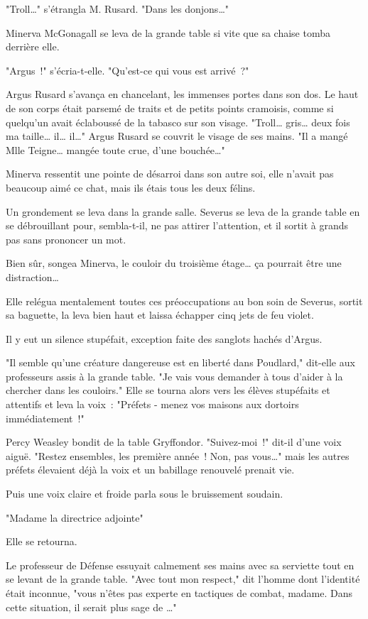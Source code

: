 "Troll…" s'étrangla M. Rusard. "Dans les donjons…"

Minerva McGonagall se leva de la grande table si vite que sa chaise tomba derrière elle.

"Argus~!" s'écria-t-elle. "Qu'est-ce qui vous est arrivé~?"

Argus Rusard s'avança en chancelant, les immenses portes dans son dos. Le haut de son corps était parsemé de traits et de petits points cramoisis, comme si quelqu'un avait éclaboussé de la tabasco sur son visage. "Troll… gris… deux fois ma taille… il… il…" Argus Rusard se couvrit le visage de ses mains. "Il a mangé Mlle Teigne… mangée toute crue, d'une bouchée…"

Minerva ressentit une pointe de désarroi dans son autre soi, elle n'avait pas beaucoup aimé ce chat, mais ils étais tous les deux félins.

Un grondement se leva dans la grande salle. Severus se leva de la grande table en se débrouillant pour, sembla-t-il, ne pas attirer l'attention, et il sortit à grands pas sans prononcer un mot.

Bien sûr, songea Minerva, le couloir du troisième étage… ça pourrait être une distraction…

Elle relégua mentalement toutes ces préoccupations au bon soin de Severus, sortit sa baguette, la leva bien haut et laissa échapper cinq jets de feu violet.

Il y eut un silence stupéfait, exception faite des sanglots hachés d'Argus.

"Il semble qu'une créature dangereuse est en liberté dans Poudlard," dit-elle aux professeurs assis à la grande table. "Je vais vous demander à tous d'aider à la chercher dans les couloirs." Elle se tourna alors vers les élèves stupéfaits et attentifs et leva la voix~: "Préfets - menez vos maisons aux dortoirs immédiatement~!"

Percy Weasley bondit de la table Gryffondor. "Suivez-moi~!" dit-il d'une voix aiguë. "Restez ensembles, les première année~! Non, pas vous…" mais les autres préfets élevaient déjà la voix et un babillage renouvelé prenait vie.

Puis une voix claire et froide parla sous le bruissement soudain.

"Madame la directrice adjointe"

Elle se retourna.

Le professeur de Défense essuyait calmement ses mains avec sa serviette tout en se levant de la grande table. "Avec tout mon respect," dit l'homme dont l'identité était inconnue, "vous n'êtes pas experte en tactiques de combat, madame. Dans cette situation, il serait plus sage de …"

